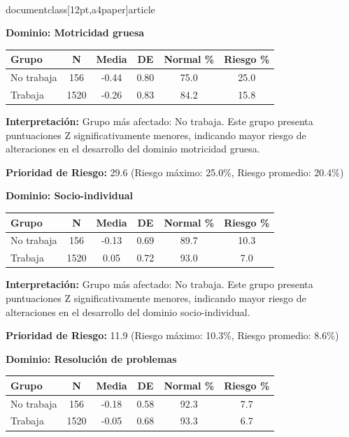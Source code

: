 \\documentclass[12pt,a4paper]{article}
\begin{document}
\textbf{Dominio: Motricidad gruesa}


\begin{center}
\begin{tabular}{|l|c|c|c|c|c|}
\hline
\textbf{Grupo} & \textbf{N} & \textbf{Media} & \textbf{DE} & \textbf{Normal \%} & \textbf{Riesgo \%} \\
\hline
No trabaja & 156 & -0.44 & 0.80 & 75.0 & 25.0 \\
Trabaja & 1520 & -0.26 & 0.83 & 84.2 & 15.8 \\

\hline
\end{tabular}
\end{center}


\textbf{Interpretación:} Grupo más afectado: No trabaja. Este grupo presenta puntuaciones Z significativamente menores, indicando mayor riesgo de alteraciones en el desarrollo del dominio motricidad gruesa.

\textbf{Prioridad de Riesgo:} 29.6 (Riesgo máximo: 25.0\%, Riesgo promedio: 20.4\%)


\vspace{0.5cm}


\textbf{Dominio: Socio-individual}


\begin{center}
\begin{tabular}{|l|c|c|c|c|c|}
\hline
\textbf{Grupo} & \textbf{N} & \textbf{Media} & \textbf{DE} & \textbf{Normal \%} & \textbf{Riesgo \%} \\
\hline
No trabaja & 156 & -0.13 & 0.69 & 89.7 & 10.3 \\
Trabaja & 1520 & 0.05 & 0.72 & 93.0 & 7.0 \\

\hline
\end{tabular}
\end{center}


\textbf{Interpretación:} Grupo más afectado: No trabaja. Este grupo presenta puntuaciones Z significativamente menores, indicando mayor riesgo de alteraciones en el desarrollo del dominio socio-individual.

\textbf{Prioridad de Riesgo:} 11.9 (Riesgo máximo: 10.3\%, Riesgo promedio: 8.6\%)


\vspace{0.5cm}


\textbf{Dominio: Resolución de problemas}


\begin{center}
\begin{tabular}{|l|c|c|c|c|c|}
\hline
\textbf{Grupo} & \textbf{N} & \textbf{Media} & \textbf{DE} & \textbf{Normal \%} & \textbf{Riesgo \%} \\
\hline
No trabaja & 156 & -0.18 & 0.58 & 92.3 & 7.7 \\
Trabaja & 1520 & -0.05 & 0.68 & 93.3 & 6.7 \\

\hline
\end{tabular}
\end{center}
\end{document}
